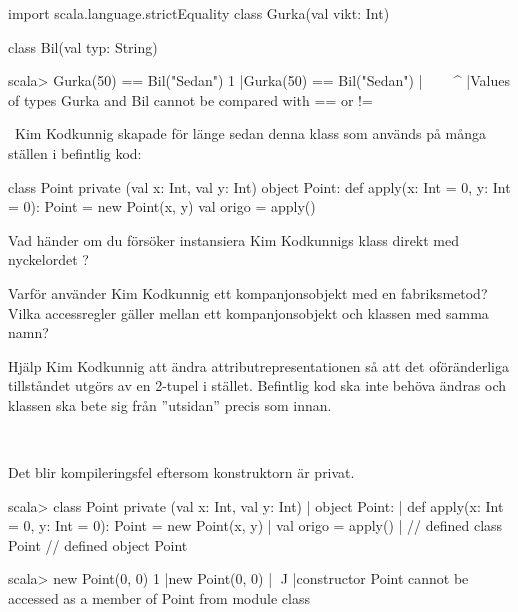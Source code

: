 \begin{Code}
import scala.language.strictEquality
class Gurka(val vikt: Int)

class Bil(val typ: String)
\end{Code}

\begin{REPL}
scala> Gurka(50) == Bil("Sedan")
1 |Gurka(50) == Bil("Sedan")
  |^^^^^^^^^^^^^^^^^^^^^^^^^
  |Values of types Gurka and Bil cannot be compared with == or !=
\end{REPL}

\QUESTEND



\QUESTBEGIN

\Task \what~Kim Kodkunnig skapade för länge sedan denna klass som används på många ställen i befintlig kod:

\begin{Code}
class Point private (val x: Int, val y: Int)
object Point:
  def apply(x: Int = 0, y: Int = 0): Point = new Point(x, y)
  val origo = apply()
\end{Code}

\Subtask Vad händer om du försöker instansiera Kim Kodkunnigs klass direkt med nyckelordet ?

\Subtask Varför använder Kim Kodkunnig ett kompanjonsobjekt med en fabriksmetod? Vilka accessregler gäller mellan ett kompanjonsobjekt och klassen med samma namn?

\Subtask Hjälp Kim Kodkunnig att ändra attributrepresentationen så att det oföränderliga tillståndet utgörs av en 2-tupel  i stället. Befintlig kod ska inte behöva ändras och klassen  ska bete sig från ''utsidan'' precis som innan.

\SOLUTION

\TaskSolved \what~

\SubtaskSolved Det blir kompileringsfel eftersom konstruktorn är privat.
\begin{REPL}
scala> class Point private (val x: Int, val y: Int)
     | object Point:
     |   def apply(x: Int = 0, y: Int = 0): Point = new Point(x, y)
     |   val origo = apply()
     |
// defined class Point
// defined object Point

scala> new Point(0, 0)
1 |new Point(0, 0)
  |    ^^^^^
  |constructor Point cannot be accessed as a member of Point from module class
\end{REPL}

